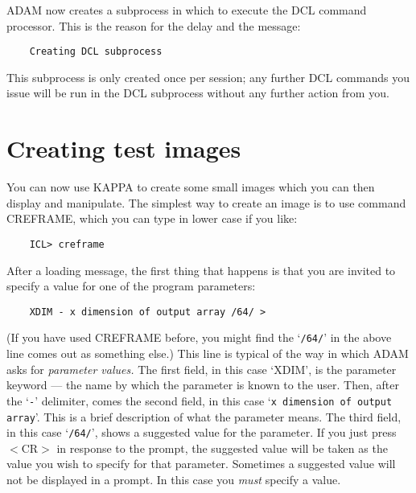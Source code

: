 ADAM now creates a subprocess in which to execute the DCL command processor.
This is the reason for the delay and the message:

\begin{small}
\begin{verbatim}
    Creating DCL subprocess
\end{verbatim}
\end{small}

This subprocess is only created once per session; any further DCL commands you
issue will be run in the DCL subprocess without any further action from you.

\section{Creating test images}
\label{S_creimag}

You can now use KAPPA to create some small images which you can then display
and manipulate.
The simplest way to create an image is to use command CREFRAME, which
you can type in lower case if you like:

\begin{small}
\begin{verbatim}
    ICL> creframe
\end{verbatim}
\end{small}

After a loading message, the first thing that happens is that you are invited
to specify a value for one of the program parameters:

\begin{small}
\begin{verbatim}
    XDIM - x dimension of output array /64/ > 
\end{verbatim}
\end{small}

(If you have used CREFRAME before, you might find the `\verb+/64/+' in the 
above
line comes out as something else.)
This line is typical of the way in which ADAM asks for {\em parameter values.}
The first field, in this case `XDIM', is the parameter keyword --- the name by
which the parameter is known to the user.
Then, after the `\verb+-+' delimiter, comes the second field, in this case
`\verb+x dimension of output array+'.
This is a brief description of what the parameter means.
The third field, in this case `\verb+/64/+', shows a suggested value for the
parameter.
If you just press $<$CR$>$ in response to the prompt, the suggested value will
be taken as the value you wish to specify for that parameter.
Sometimes a suggested value will not be displayed in a prompt.
In this case you {\em must} specify a value.

